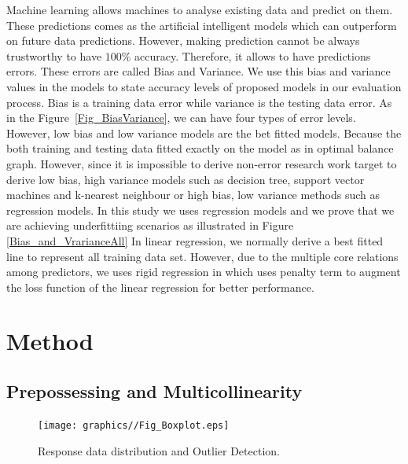 Machine learning allows machines to analyse existing data and 
predict on them. These predictions comes as the 
artificial intelligent models which can outperform on future data predictions. 
However, making prediction cannot be always trustworthy 
to have $100\%$ accuracy. 
Therefore, it allows to have predictions errors. 
These errors are called Bias and Variance.
We use this bias and variance values in the models to state 
accuracy levels of proposed models in our evaluation process.
Bias is a training data error while variance is the testing data error.
As in the Figure~\cref{Fig_BiasVariance}, we can have four types of error levels.
However, low bias and low variance models are the bet fitted models.
Because the both training and testing data fitted exactly on
the model as in optimal balance graph.
However, since it is impossible to derive non-error research
work target to derive low bias, high variance models such as
decision tree, support vector machines and k-nearest neighbour or high bias, low variance methods such as regression models.
In this study we uses regression models and we prove that
we are achieving underfittiing scenarios as illustrated in Figure \cref{Bias_and_VrarianceAll}
In linear regression, we normally derive a best fitted line to represent all training data set.
However, due to the multiple core relations among predictors, we uses rigid regression in which uses penalty term to 
augment the loss function of the linear regression for better performance.

\gliMarker  %

\section{Method} \label{sec-method}

\subsection{Prepossessing and Multicollinearity}

\begin{figure}
  \texttt{[image: graphics//Fig\_Boxplot.eps]}
  \caption{Response data distribution and Outlier Detection.} \label{Fig_Boxplot}
\end{figure}

